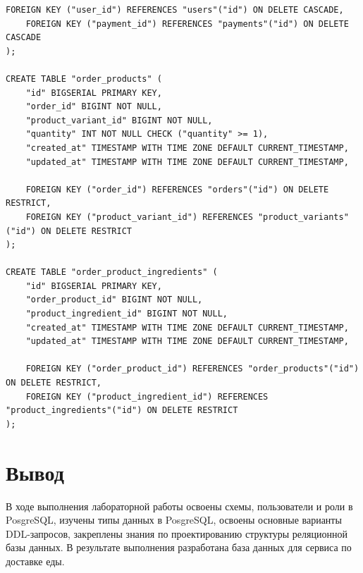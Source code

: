 \documentclass[a4paper,14pt]{extarticle}
\begin{document}
\begin{Verbatim}[tabsize=4,fontsize=\small]
    FOREIGN KEY ("user_id") REFERENCES "users"("id") ON DELETE CASCADE,
    FOREIGN KEY ("payment_id") REFERENCES "payments"("id") ON DELETE CASCADE
);

CREATE TABLE "order_products" (
    "id" BIGSERIAL PRIMARY KEY,
    "order_id" BIGINT NOT NULL,
    "product_variant_id" BIGINT NOT NULL,
    "quantity" INT NOT NULL CHECK ("quantity" >= 1),
    "created_at" TIMESTAMP WITH TIME ZONE DEFAULT CURRENT_TIMESTAMP,
    "updated_at" TIMESTAMP WITH TIME ZONE DEFAULT CURRENT_TIMESTAMP,

    FOREIGN KEY ("order_id") REFERENCES "orders"("id") ON DELETE RESTRICT,
    FOREIGN KEY ("product_variant_id") REFERENCES "product_variants"("id") ON DELETE RESTRICT
);

CREATE TABLE "order_product_ingredients" (
    "id" BIGSERIAL PRIMARY KEY,
    "order_product_id" BIGINT NOT NULL,
    "product_ingredient_id" BIGINT NOT NULL,
    "created_at" TIMESTAMP WITH TIME ZONE DEFAULT CURRENT_TIMESTAMP,
    "updated_at" TIMESTAMP WITH TIME ZONE DEFAULT CURRENT_TIMESTAMP,

    FOREIGN KEY ("order_product_id") REFERENCES "order_products"("id") ON DELETE RESTRICT,
    FOREIGN KEY ("product_ingredient_id") REFERENCES "product_ingredients"("id") ON DELETE RESTRICT
);
  \end{Verbatim}

  \section*{Вывод}
  В ходе выполнения лабораторной работы освоены схемы, пользователи и роли в PosgreSQL, изучены типы данных в PosgreSQL, освоены основные варианты DDL-запросов, закреплены знания по проектированию структуры реляционной базы данных. В результате выполнения разработана база данных для сервиса по доставке еды.
\end{document}
